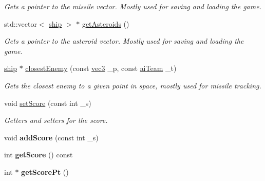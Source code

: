\begin{DoxyCompactItemize}
\begin{DoxyCompactList}\small\item\em Gets a pointer to the missile vector. Mostly used for saving and loading the game. \end{DoxyCompactList}\item 
\hypertarget{classuniverse_af16581985c050c653eac9381d619f4b8}{std\-::vector$<$ \hyperlink{classship}{ship} $>$ $\ast$ \hyperlink{classuniverse_af16581985c050c653eac9381d619f4b8}{get\-Asteroids} ()}\label{classuniverse_af16581985c050c653eac9381d619f4b8}

\begin{DoxyCompactList}\small\item\em Gets a pointer to the asteroid vector. Mostly used for saving and loading the game. \end{DoxyCompactList}\item 
\hyperlink{classship}{ship} $\ast$ \hyperlink{classuniverse_a62c18e794bc3f09e1a724b8588ee46a4}{closest\-Enemy} (const \hyperlink{structvec3}{vec3} \-\_\-p, const \hyperlink{enemy_8hpp_abac1fdbabb5a6be5f0d6ae40be5c5a58}{ai\-Team} \-\_\-t)
\begin{DoxyCompactList}\small\item\em Gets the closest enemy to a given point in space, mostly used for missile tracking. \end{DoxyCompactList}\item 
\hypertarget{classuniverse_ab23b66c1edc3f954997475cdc0c9cd4a}{void \hyperlink{classuniverse_ab23b66c1edc3f954997475cdc0c9cd4a}{set\-Score} (const int \-\_\-s)}\label{classuniverse_ab23b66c1edc3f954997475cdc0c9cd4a}

\begin{DoxyCompactList}\small\item\em Getters and setters for the score. \end{DoxyCompactList}\item 
\hypertarget{classuniverse_a6b615a23dcbb9b55c07ed301101b99ea}{void {\bfseries add\-Score} (const int \-\_\-s)}\label{classuniverse_a6b615a23dcbb9b55c07ed301101b99ea}

\item 
\hypertarget{classuniverse_a1d401f812d523ba736f2e2adc858c2e5}{int {\bfseries get\-Score} () const }\label{classuniverse_a1d401f812d523ba736f2e2adc858c2e5}

\item 
\hypertarget{classuniverse_a8b31cce5565fdd692fdbb476c6e54257}{int $\ast$ {\bfseries get\-Score\-Pt} ()}\label{classuniverse_a8b31cce5565fdd692fdbb476c6e54257}


\end{DoxyCompactItemize}
